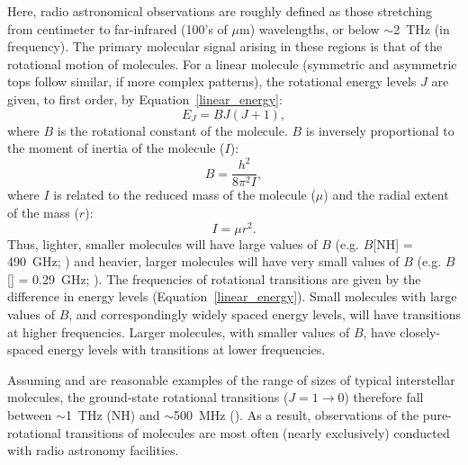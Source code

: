 \documentclass[twocolumn]{aastex631}
\begin{document}
Here, radio astronomical observations are roughly defined as those stretching from centimeter to far-infrared (100's of $\mu$m) wavelengths, or below $\sim$2~THz (in frequency).  The primary molecular signal arising in these regions is that of the rotational motion of molecules.  For a linear molecule (symmetric and asymmetric tops follow similar, if more complex patterns), the rotational energy levels $J$ are given, to first order, by Equation~\ref{linear_energy}:
\begin{equation}
E_J = BJ(J+1),
\label{linear_energy}
\end{equation}
where $B$ is the rotational constant of the molecule.  $B$ is inversely proportional to the moment of inertia of the molecule ($I$):
\begin{equation}
B = \frac{h^2}{8\pi^2I},
\label{linear_B}
\end{equation}
where $I$ is related to the reduced mass of the molecule ($\mu$) and the radial extent of the mass ($r$):
\begin{equation}
I = \mu r^2.
\end{equation}
Thus, lighter, smaller molecules will have large values of $B$ (e.g. $B$[NH] = 490~GHz; \citealt{Klaus:1997ku}) and heavier, larger molecules will have very small values of $B$ (e.g. $B$[] =  0.29~GHz; \citealt{McCarthy:2000eo}).  The frequencies of rotational transitions are given by the difference in energy levels (Equation~\ref{linear_energy}). Small molecules with large values of $B$, and correspondingly widely spaced energy levels, will have transitions at higher frequencies.  Larger molecules, with smaller values of $B$, have closely-spaced energy levels with transitions at lower frequencies.

Assuming  and  are reasonable examples of the range of sizes of typical interstellar molecules, the ground-state rotational transitions ($J = 1\rightarrow0$) therefore fall between $\sim$1~THz (NH) and $\sim$500~MHz ().   As a result, observations of the pure-rotational transitions of molecules are most often (nearly exclusively) conducted with radio astronomy facilities.
\end{document}
